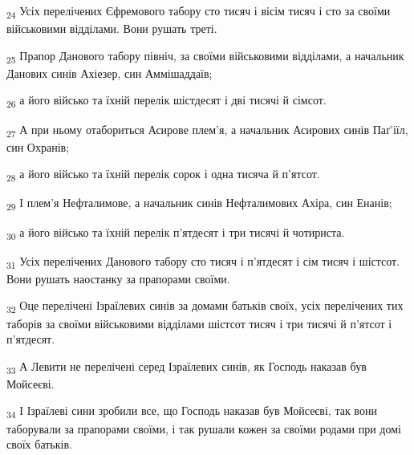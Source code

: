 \begin{tcolorbox}
\textsubscript{24} Усіх перелічених Єфремового табору сто тисяч і вісім тисяч і сто за своїми військовими відділами. Вони рушать треті.
\end{tcolorbox}
\begin{tcolorbox}
\textsubscript{25} Прапор Данового табору північ, за своїми військовими відділами, а начальник Данових синів Ахіезер, син Аммішаддаїв;
\end{tcolorbox}
\begin{tcolorbox}
\textsubscript{26} а його військо та їхній перелік шістдесят і дві тисячі й сімсот.
\end{tcolorbox}
\begin{tcolorbox}
\textsubscript{27} А при ньому отабориться Асирове плем'я, а начальник Асирових синів Паґ'іїл, син Охранів;
\end{tcolorbox}
\begin{tcolorbox}
\textsubscript{28} а його військо та їхній перелік сорок і одна тисяча й п'ятсот.
\end{tcolorbox}
\begin{tcolorbox}
\textsubscript{29} І плем'я Нефталимове, а начальник синів Нефталимових Ахіра, син Енанів;
\end{tcolorbox}
\begin{tcolorbox}
\textsubscript{30} а його військо та їхній перелік п'ятдесят і три тисячі й чотириста.
\end{tcolorbox}
\begin{tcolorbox}
\textsubscript{31} Усіх перелічених Данового табору сто тисяч і п'ятдесят і сім тисяч і шістсот. Вони рушать наостанку за прапорами своїми.
\end{tcolorbox}
\begin{tcolorbox}
\textsubscript{32} Оце перелічені Ізраїлевих синів за домами батьків своїх, усіх перелічених тих таборів за своїми військовими відділами шістсот тисяч і три тисячі й п'ятсот і п'ятдесят.
\end{tcolorbox}
\begin{tcolorbox}
\textsubscript{33} А Левити не перелічені серед Ізраїлевих синів, як Господь наказав був Мойсеєві.
\end{tcolorbox}
\begin{tcolorbox}
\textsubscript{34} І Ізраїлеві сини зробили все, що Господь наказав був Мойсеєві, так вони таборували за прапорами своїми, і так рушали кожен за своїми родами при домі своїх батьків.
\end{tcolorbox}
